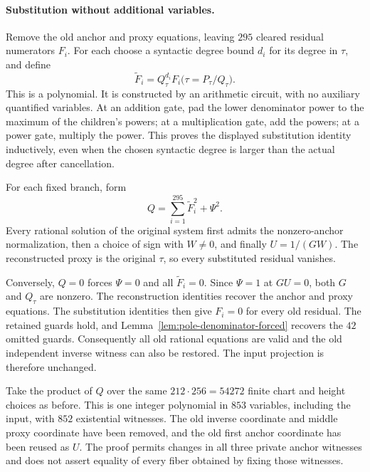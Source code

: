 \paragraph{Substitution without additional variables.}
Remove the old anchor and proxy equations, leaving $295$ cleared
residual numerators $F_i$. For each choose a syntactic degree bound
$d_i$ for its degree in $\tau$, and define
\[
 \widetilde F_i
  =Q_\tau^{d_i}
      F_i\bigl(\tau=P_\tau/Q_\tau\bigr).
\]
This is a polynomial. It is constructed by an arithmetic circuit,
with no auxiliary quantified variables. At an addition gate, pad
the lower denominator power to the maximum of the children's powers;
at a multiplication gate, add the powers; at a power gate, multiply
the power. This proves the displayed substitution identity
inductively, even when the chosen syntactic degree is larger than
the actual degree after cancellation.

For each fixed branch, form
\[
 Q=\sum_{i=1}^{295}\widetilde F_i^2+\Psi^2.
\]
Every rational solution of the original system first admits the
nonzero-anchor normalization, then a choice of sign with $W\ne0$,
and finally $U=1/(GW)$. The reconstructed proxy is the original
$\tau$, so every substituted residual vanishes.

Conversely, $Q=0$ forces $\Psi=0$ and all
$\widetilde F_i=0$. Since $\Psi=1$ at $GU=0$, both $G$ and
$Q_\tau$ are nonzero. The reconstruction identities recover the
anchor and proxy equations. The substitution identities then give
$F_i=0$ for every old residual. The retained guards hold, and
Lemma~\ref{lem:pole-denominator-forced} recovers the $42$ omitted
guards. Consequently all old rational equations are valid and the
old independent inverse witness can also be restored. The input
projection is therefore unchanged.

Take the product of $Q$ over the same $212\cdot256=54272$ finite
chart and height choices as before. This is one integer polynomial
in $853$ variables, including the input, with $852$ existential
witnesses. The old inverse coordinate and middle proxy coordinate
have been removed, and the old first anchor coordinate has been
reused as $U$. The proof permits changes in all three private
anchor witnesses and does not assert equality of every fiber
obtained by fixing those witnesses.


